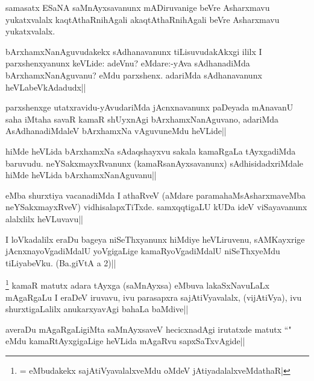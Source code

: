 \begin{artha}%
samasatx ESaNA saMnAyxsavanunx mADiruvanige beVre Asharxmavu yukatxvalalx kaqtAthaRnihAgali akaqtAthaRnihAgali beVre Asharxmavu yukatxvalalx.
\end{artha}

\begin{artha}
bArxhamxNanAguvudakekx sAdhanavanunx tiLisuvudakAkxgi ililx I parxshenxyanunx keVLide: adeVnu? eMdare:-yAva sAdhanadiMda bArxhamxNanAguvanu? eMdu parxshenx. adariMda sAdhanavanunx heVLabeVkAdadudx||
\end{artha}

\begin{artha}
parxshenxge utatxravidu-yAvudariMda jAcnxnavanunx paDeyada mAnavanU saha iMtaha savaR kamaR shUyxnAgi bArxhamxNanAguvano, adariMda AsAdhanadiMdaleV bArxhamxNa vAguvuneMdu heVLide||
\end{artha}

\begin{artha}
hiMde heVLida bArxhamxNa sAdaqshayxvu sakala kamaRgaLa tAyxgadiMda baruvudu. neYSakxmayxRvanunx (kamaRsanAyxsavanunx) sAdhisidadxriMdale hiMde heVLida bArxhamxNanAguvanu||
\end{artha}

\begin{artha}
\stext eMba shurxtiya vacanadiMda I athaRveV (aMdare paramahaMsAsharxmaveMba neYSakxmayxRveV) vidhisalapxTiTxde. samxqqtigaLU kUDa ideV viSayavanunx alalxlilx heVLuvavu||
\end{artha}%


\begin{artha}
I loVkadalilx eraDu bageya niSeThxyanunx hiMdiye heVLiruvenu, sAMKayxrige jAcnxnayoVgadiMdalU yoVgigaLige kamaRyoVgadiMdalU niSeThxyeMdu tiLiyabeVku. (Ba.giVtA a 2)||
\end{artha}


\begin{artha}
\footnote[1]{\stext = eMbudakekx sajAtiVyavalalxveMdu oMdeV jAtiyadalalxveMdathaR|} kamaR matutx adara tAyxga (saMnAyxsa) eMbuva lakaSxNavuLaLx mAgaRgaLu I eraDeV iruvavu, ivu parasapxra sajAtiVyavalalx, (vijAtiVya), ivu shurxtigaLalilx anukarxyavAgi bahaLa baMdive||
\end{artha}

\begin{artha}
averaDu mAgaRgaLigiMta saMnAyxsaveV hecicxnadAgi irutatxde matutx ``\stext " eMdu kamaRtAyxgigaLige heVLida mAgaRvu sapxSaTxvAgide||
\end{artha}

